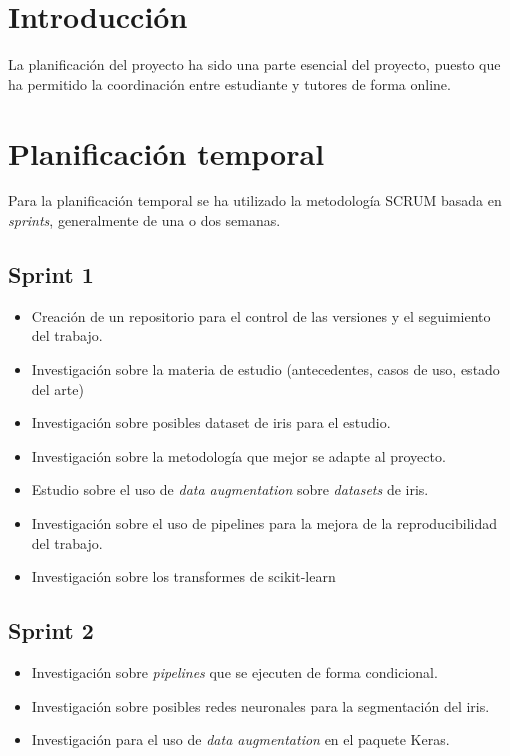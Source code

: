 
\section{Introducción}

La planificación del proyecto ha sido una parte esencial del proyecto, puesto que ha permitido la coordinación entre estudiante y tutores de forma online.

\section{Planificación temporal}

Para la planificación temporal se ha utilizado la metodología SCRUM basada en \textit{sprints}, generalmente de una o dos semanas.

\subsection{Sprint 1}

\begin{itemize}
\item Creación de un repositorio para el control de las versiones y el seguimiento del trabajo.
\item Investigación sobre la materia de estudio (antecedentes, casos de uso, estado del arte)
\item Investigación sobre posibles dataset de iris para el estudio.
\item Investigación sobre la metodología que mejor se adapte al proyecto.
\item Estudio sobre el uso de \textit{data augmentation} sobre \textit{datasets} de iris.
\item Investigación sobre el uso de pipelines para la mejora de la reproducibilidad del trabajo.
\item Investigación sobre los transformes de scikit-learn
\end{itemize}

\subsection{Sprint 2}

\begin{itemize}
\item Investigación sobre \textit{pipelines} que se ejecuten de forma condicional.
\item Investigación sobre posibles redes neuronales para la segmentación del iris.
\item Investigación para el uso de \textit{data augmentation} en el paquete Keras.
\end{itemize}


